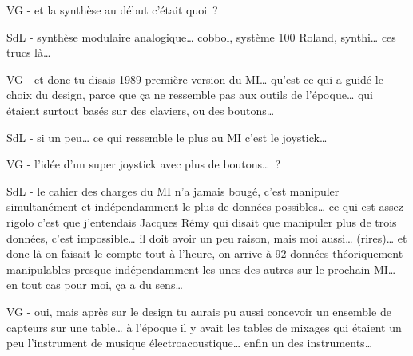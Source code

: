 VG - et la synthèse au début c'était quoi ? 

SdL - synthèse modulaire analogique… cobbol, système 100 Roland, synthi… ces trucs là… 

VG - et donc tu disais 1989 première version du MI… qu'est ce qui a guidé le choix du design, parce que ça ne ressemble pas aux outils de l'époque… qui étaient surtout basés sur des claviers, ou des boutons… 

SdL - si un peu… ce qui ressemble le plus au MI c'est le joystick… 

VG - l'idée d'un super joystick avec plus de boutons… ? 

SdL - le cahier des charges du MI n'a jamais bougé, c'est manipuler simultanément et indépendamment le plus de données possibles… ce qui est assez rigolo c'est que j'entendais Jacques Rémy qui disait que manipuler plus de trois données, c'est impossible… il doit avoir un peu raison, mais moi aussi… (rires)… et donc là on faisait le compte tout à l'heure, on arrive à 92 données théoriquement manipulables presque indépendamment les unes des autres sur le prochain MI… en tout cas pour moi, ça a du sens…  

VG - oui, mais après sur le design tu aurais pu aussi concevoir un ensemble de capteurs sur une table… à l'époque il y avait les tables de mixages qui étaient un peu l'instrument de musique électroacoustique… enfin un des instruments… 

